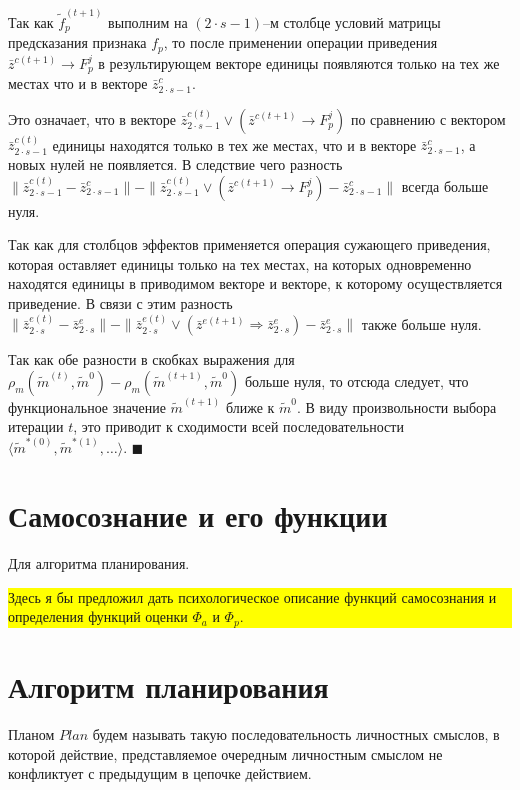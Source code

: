 \documentclass[a4paper, 12pt]{article}
\theoremstyle{plain}
\newenvironment{Proof}%
	{\par\noindent{\bf Доказательство.}}%
	{\hfill$\scriptstyle\blacksquare$}
\begin{document}
\begin{Proof}
		Так как $\tilde f_p^{(t+1)}$ выполним на $(2\cdot s-1)$–м столбце условий матрицы предсказания признака $f_p$, то после применении операции приведения $\bar z^{c(t+1)}\rightarrow F_p^j$ в результирующем векторе единицы появляются только на тех же местах что и в векторе $\bar z_{2\cdot s-1}^c$. 
		
		Это означает, что в векторе $\bar z_{2\cdot s-1}^{c(t)}\vee(\bar z^{c(t+1)}\rightarrow F_p^j)$ по сравнению с вектором $\bar z_{2\cdot s-1}^{c(t)}$  единицы находятся только в тех же местах, что и в векторе $\bar z_{2\cdot s-1}^c$, а новых нулей не появляется. В следствие чего разность $\|\bar z_{2\cdot s-1}^{c(t)}-\bar z_{2\cdot s-1}^c\|-\|\bar z_{2\cdot s-1}^{c(t)}\vee(\bar z^{c(t+1)}\rightarrow F_p^j)-\bar z_{2\cdot s-1}^c\|$ всегда больше нуля.
		
		Так как для столбцов эффектов применяется операция сужающего приведения, которая оставляет единицы только на тех местах, на которых одновременно находятся единицы в приводимом векторе и векторе, к которому осуществляется приведение. В связи с этим разность $\|\bar z_{2\cdot s}^{e(t)}-\bar z_{2\cdot s}^e\|-\|\bar z_{2\cdot s}^{e(t)}\vee(\bar z^{e(t+1)}\Rightarrow\bar z_{2\cdot s}^e)-\bar z_{2\cdot s}^e\|$ также больше нуля.
		
		Так как обе разности в скобках выражения для $\rho_m(\tilde m^{(t)},\tilde m^0)-\rho_m(\tilde m^{(t+1)},\tilde m^0)$ больше нуля, то отсюда следует, что функциональное значение $\tilde m^{(t+1)}$ ближе к $\tilde m^0$. В виду произвольности выбора итерации $t$, это приводит к сходимости всей последовательности $\langle\tilde m^{*(0)},\tilde m^{*(1)},\dots\rangle$. 
	\end{Proof}
	
	\section{Самосознание и его функции} Для алгоритма планирования.
	
	\noindent\colorbox{yellow}{
		\parbox{\dimexpr\linewidth-2\fboxsep}{Здесь я бы предложил дать психологическое описание функций самосознания и определения функций оценки $\Phi_a$ и $\Phi_p$.}
	}
	
	\section{Алгоритм планирования}	Планом $Plan$ будем называть такую последовательность личностных смыслов, в которой действие, представляемое очередным личностным смыслом не конфликтует с предыдущим в цепочке действием.
	
\end{document}
